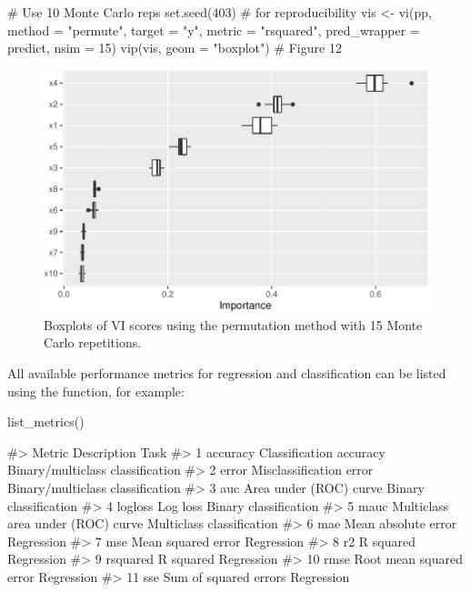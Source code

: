 \begin{Schunk}
\begin{Sinput}
# Use 10 Monte Carlo reps
set.seed(403)  # for reproducibility
vis <- vi(pp, method = "permute", target = "y", metric = "rsquared",
          pred_wrapper = predict, nsim = 15)
vip(vis, geom = "boxplot")  # Figure 12
\end{Sinput}
\begin{figure}[!htb]

{\centering \includegraphics[width=0.7\linewidth]{greenwell-boehmke_files/figure-latex/vip-boxplots-1}

}

\caption[Boxplots of VI scores using the permutation method with 15 Monte Carlo repetitions]{Boxplots of VI scores using the permutation method with 15 Monte Carlo repetitions.}\label{fig:vip-boxplots}
\end{figure}
\end{Schunk}

All available performance metrics for regression and classification can
be listed using the  function, for example:

\begin{Schunk}
\begin{Sinput}
list_metrics()
\end{Sinput}
\begin{Soutput}
#>      Metric                       Description                             Task
#> 1  accuracy           Classification accuracy Binary/multiclass classification
#> 2     error           Misclassification error Binary/multiclass classification
#> 3       auc            Area under (ROC) curve            Binary classification
#> 4   logloss                          Log loss            Binary classification
#> 5      mauc Multiclass area under (ROC) curve        Multiclass classification
#> 6       mae               Mean absolute error                       Regression
#> 7       mse                Mean squared error                       Regression
#> 8        r2                         R squared                       Regression
#> 9  rsquared                         R squared                       Regression
#> 10     rmse           Root mean squared error                       Regression
#> 11      sse             Sum of squared errors                       Regression
\end{Soutput}
\end{Schunk}

